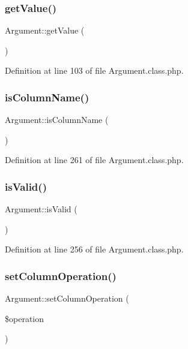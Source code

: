 \subsubsection{\texorpdfstring{get\+Value()}{getValue()}}
{\footnotesize\ttfamily Argument\+::get\+Value (\begin{DoxyParamCaption}{ }\end{DoxyParamCaption})}



Definition at line 103 of file Argument.\+class.\+php.

\mbox{\label{classArgument_aced37db9a6cf1ec57e8acdea23797927}} 
\subsubsection{\texorpdfstring{is\+Column\+Name()}{isColumnName()}}
{\footnotesize\ttfamily Argument\+::is\+Column\+Name (\begin{DoxyParamCaption}{ }\end{DoxyParamCaption})}



Definition at line 261 of file Argument.\+class.\+php.

\mbox{\label{classArgument_a3e07b6c495166e96aea4e4f90bb0fe53}} 
\subsubsection{\texorpdfstring{is\+Valid()}{isValid()}}
{\footnotesize\ttfamily Argument\+::is\+Valid (\begin{DoxyParamCaption}{ }\end{DoxyParamCaption})}



Definition at line 256 of file Argument.\+class.\+php.

\mbox{\label{classArgument_a3e737e0b4af5559f56b35c7c1b1b4f2a}} 
\subsubsection{\texorpdfstring{set\+Column\+Operation()}{setColumnOperation()}}
{\footnotesize\ttfamily Argument\+::set\+Column\+Operation (\begin{DoxyParamCaption}\item[{}]{\$operation }\end{DoxyParamCaption})}



